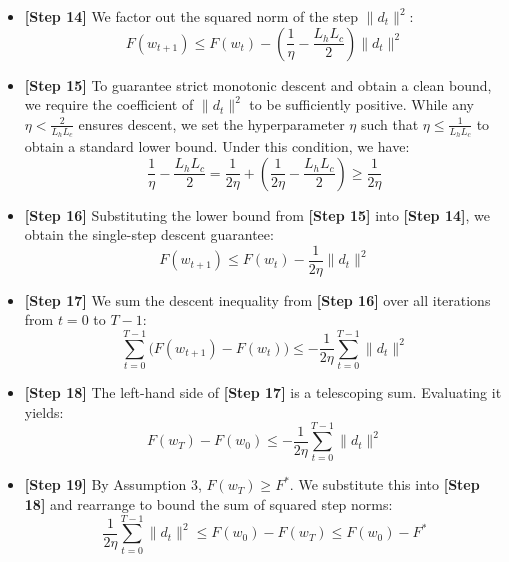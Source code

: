 \documentclass[11pt]{article}
\begin{document}
\begin{itemize}
    \item \textbf{[Step 14]} We factor out the squared norm of the step $\|d_t\|^2$:
    \begin{equation}
        F(w_{t+1}) \leq F(w_t) - \left( \frac{1}{\eta} - \frac{L_h L_c}{2} \right) \|d_t\|^2
    \end{equation}
    
    \item \textbf{[Step 15]} To guarantee strict monotonic descent and obtain a clean bound, we require the coefficient of $\|d_t\|^2$ to be sufficiently positive. 
    While any $\eta < \frac{2}{L_h L_c}$ ensures descent, we set the hyperparameter $\eta$ such that $\eta \leq \frac{1}{L_h L_c}$ to obtain a standard lower bound. Under this condition, we have:
    \begin{equation}
        \frac{1}{\eta} - \frac{L_h L_c}{2} = \frac{1}{2\eta} + \left( \frac{1}{2\eta} - \frac{L_h L_c}{2} \right) \geq \frac{1}{2\eta}
    \end{equation}
    
    \item \textbf{[Step 16]} Substituting the lower bound from \textbf{[Step 15]} into \textbf{[Step 14]}, we obtain the single-step descent guarantee:
    \begin{equation}
        F(w_{t+1}) \leq F(w_t) - \frac{1}{2\eta} \|d_t\|^2
    \end{equation}
    
    \item \textbf{[Step 17]} We sum the descent inequality from \textbf{[Step 16]} over all iterations from $t=0$ to $T-1$:
    \begin{equation}
        \sum_{t=0}^{T-1} \big( F(w_{t+1}) - F(w_t) \big) \leq -\frac{1}{2\eta} \sum_{t=0}^{T-1} \|d_t\|^2
    \end{equation}
    
    \item \textbf{[Step 18]} The left-hand side of \textbf{[Step 17]} is a telescoping sum. Evaluating it yields:
    \begin{equation}
        F(w_T) - F(w_0) \leq -\frac{1}{2\eta} \sum_{t=0}^{T-1} \|d_t\|^2
    \end{equation}
    
    \item \textbf{[Step 19]} By Assumption 3, $F(w_T) \geq F^*$. We substitute this into \textbf{[Step 18]} and rearrange to bound the sum of squared step norms:
    \begin{equation}
        \frac{1}{2\eta} \sum_{t=0}^{T-1} \|d_t\|^2 \leq F(w_0) - F(w_T) \leq F(w_0) - F^*
    \end{equation}
    

\end{itemize}
\end{document}
